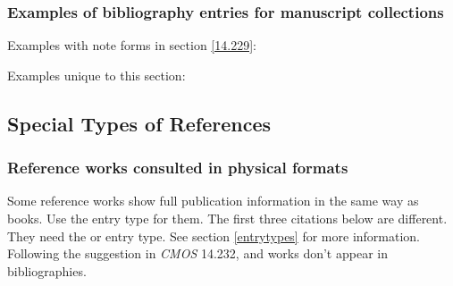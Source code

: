 \documentclass[11pt,letterpaper,oneside]{article}
\begin{document}
\setcounter{subsubsection}{229}
\subsubsection{Examples of bibliography entries for manuscript collections}
\label{14.230}

Examples with note forms in section \ref{14.229}:

\begin{bibonly}
\nocite{merriam,pasociety,overseers,morris,washington}
\end{bibonly}

\noindent Examples unique to this section:

\begin{citebib}
\item \cite{wonpr}
\item \cite{dinkel}
\end{citebib}

\setcounter{subsection}{9}
\subsection{Special Types of References}
\setcounter{subsection}{14}

\setcounter{subsubsection}{231}
\subsubsection{Reference works consulted in physical formats}
\label{14.232}

Some reference works show full publication information in the same way
as books. Use the  entry type for them. The first three
citations below are different. They need the  or
 entry type. See section \ref{entrytypes} for
more information. Following the suggestion in \textit{CMOS} 14.232,
 and  works don't appear in
bibliographies.

\begin{citebib}
\item \cite{salvation1980}
\item \cite{hootananny2009}
\item \cite{dab1937}
\item \cite[s.vv. \mkbibquote{police ranks}, \mkbibquote{postal addresses}]{timestyle2003}
\item \cite[6.8.2]{mla2008}
\end{citebib}
\end{document}
